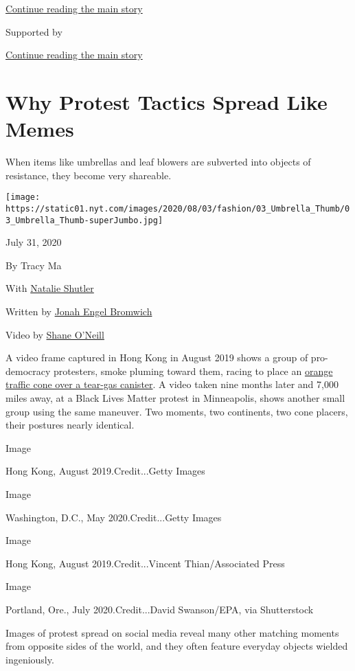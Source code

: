\protect\hyperlink{after-top}{Continue reading the main story}

Supported by

\protect\hyperlink{after-sponsor}{Continue reading the main story}

\hypertarget{why-protest-tactics-spread-like-memes}{%
\section{Why Protest Tactics Spread Like
Memes}\label{why-protest-tactics-spread-like-memes}}

When items like umbrellas and leaf blowers are subverted into objects of
resistance, they become very shareable.

\texttt{[image: https://static01.nyt.com/images/2020/08/03/fashion/03\_Umbrella\_Thumb/03\_Umbrella\_Thumb-superJumbo.jpg]}

July 31, 2020

By Tracy Ma

With \href{https://www.nytimes.com/by/natalie-shutler}{Natalie Shutler}

Written by \href{https://www.nytimes.com/by/jonah-engel-bromwich}{Jonah
Engel Bromwich}

Video by \href{https://www.nytimes.com/by/shane-oneill}{Shane O'Neill}

A video frame captured in Hong Kong in August 2019 shows a group of
pro-democracy protesters, smoke pluming toward them, racing to place an
\href{https://slate.com/news-and-politics/2019/06/hong-kong-tear-gas-water-bottle.html}{orange
traffic cone over a tear-gas canister}. A video taken nine months later
and 7,000 miles away, at a Black Lives Matter protest in Minneapolis,
shows another small group using the same maneuver. Two moments, two
continents, two cone placers, their postures nearly identical.

Image

Hong Kong, August 2019.Credit...Getty Images

Image

Washington, D.C., May 2020.Credit...Getty Images

Image

Hong Kong, August 2019.Credit...Vincent Thian/Associated Press

Image

Portland, Ore., July 2020.Credit...David Swanson/EPA, via Shutterstock

Images of protest spread on social media reveal many other matching
moments from opposite sides of the world, and they often feature
everyday objects wielded ingeniously.

